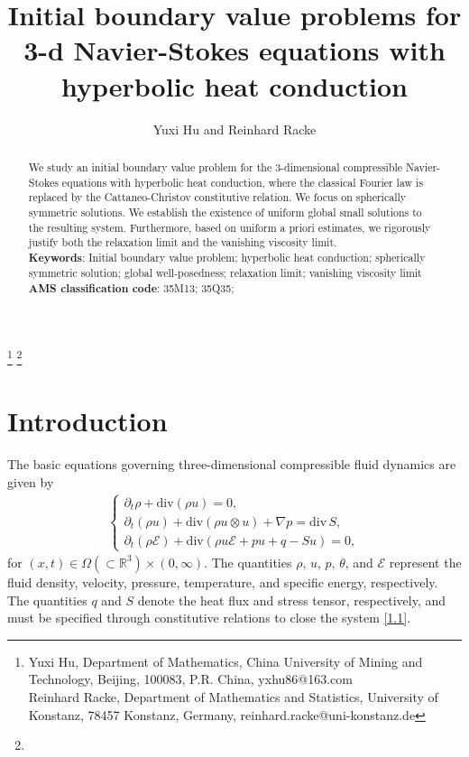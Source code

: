 \documentclass[11pt,reqno]{amsart}
\numberwithin{equation}{section}
\begin{document}
\title[Spherically solutions for relaxed CNS system]{ Initial boundary value problems for 3-d Navier-Stokes equations with  hyperbolic heat conduction}
\author{Yuxi Hu and Reinhard Racke}
 \thanks{\noindent Yuxi Hu, Department of Mathematics, China University of Mining and Technology, Beijing, 100083, P.R. China, yxhu86@163.com\\
\indent Reinhard Racke, Department of Mathematics and Statistics, University of
Konstanz, 78457 Konstanz, Germany, reinhard.racke@uni-konstanz.de
}
\thanks{\noindent  }
\begin{abstract}
We study an initial boundary value problem for the 3-dimensional compressible Navier-Stokes equations with hyperbolic heat conduction, where the classical Fourier law is replaced by the Cattaneo-Christov constitutive relation. We focus on spherically symmetric solutions.   We establish the existence of uniform global small solutions to the resulting system. Furthermore, based on uniform a priori estimates, we rigorously justify both the relaxation limit and the vanishing viscosity limit.\\
{\bf Keywords}: Initial boundary value problem; hyperbolic heat conduction; spherically symmetric solution; global well-posedness; relaxation limit; vanishing viscosity limit\\
{\bf AMS classification code}: 35M13; 35Q35;
\end{abstract}
\maketitle


\section{Introduction}


The basic equations governing three-dimensional compressible fluid dynamics are given by
\begin{align}\label{1.1}
\begin{cases}
\partial_t\rho+\mathrm{div} (\rho u)=0,\\
\partial_t(\rho u) +\mathrm{div} (\rho u\otimes u)+\nabla p=\mathrm{div}\, S,\\
\partial_t (\rho {\mathcal E})+\mathrm{div}(\rho u {\mathcal E}+pu+q-Su) =0,
\end{cases}
\end{align}
for $(x,t)\in \Omega(\subset \mathbb R^3) \times(0,\infty)$. The quantities $\rho$, $u$, $p$, $\theta$, and $\mathcal{E}$ represent the fluid density, velocity, pressure, temperature, and specific energy, respectively. The quantities $q$ and $S$ denote the heat flux and stress tensor, respectively, and must be specified through constitutive relations to close the system \eqref{1.1}.
\end{document}
